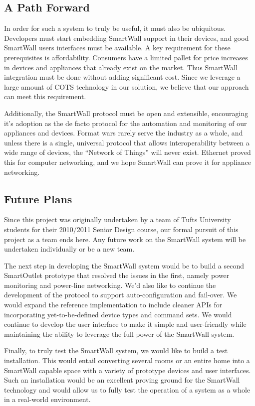 \documentclass[11pt]{article}
\begin{document}
\subsection{A Path Forward}
In order for such a system to truly be useful, it must also be
ubiquitous. Developers must start embedding SmartWall support in their
devices, and good SmartWall users interfaces must be available. A key
requirement for these prerequisites is affordability. Consumers have a
limited pallet for price increases in devices and appliances that
already exist on the market. Thus SmartWall integration must be done
without adding significant cost. Since we leverage a large amount of COTS
technology in our solution, we believe that our approach can meet this
requirement.

Additionally, the SmartWall protocol must be open and extensible,
encouraging it's adoption as the de facto protocol for the automation and
monitoring of our appliances and devices. Format wars rarely serve the
industry as a whole, and unless there is a single, universal protocol
that allows interoperability between a wide range of devices, the
``Network of Things'' will never exist. Ethernet proved this for
computer networking, and we hope SmartWall can prove it for appliance
networking.

\subsection{Future Plans}
Since this project was originally undertaken by a team of Tufts
University students
for their 2010/2011 Senior Design course, our formal pursuit of this project as
a team ends here. Any future work on the SmartWall system will be
undertaken individually or be a new team.

The next step in developing the SmartWall system would be to build a
second SmartOutlet prototype that resolved the issues in the first,
namely power monitoring and power-line networking. We'd also like to
continue the development of the protocol to support auto-configuration
and fail-over. We would expand the reference implementation to include
cleaner APIs for incorporating yet-to-be-defined device types and
command sets. We would continue to develop the user interface to make
it simple and user-friendly while maintaining the ability to leverage the
full power of the SmartWall system.

Finally, to truly test the SmartWall system, we would like to build a
test installation. This would entail converting several rooms or an
entire home into a SmartWall capable space with a variety of prototype
devices and user interfaces. Such an installation would be an excellent
proving ground for the SmartWall technology and would allow us to fully
test the operation of a system as a whole in a real-world environment.
\end{document}
